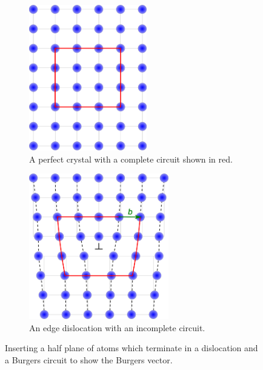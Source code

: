 \begin{figure}
\centering

\begin{subfigure}{0.4\textwidth}
\centering
\includegraphics[height=2.5in]{Perfect_crystal_loop}
\caption{A perfect crystal with a complete circuit shown in red.}
\end{subfigure}
\begin{subfigure}{0.4\textwidth}
\centering
\includegraphics[height=2.5in]{Edge_Dislocation_loop}
\caption{An edge dislocation with an incomplete circuit. \label{fig:Edge_disloc_loop}}
\end{subfigure}

\caption{Inserting a half plane of atoms which terminate in a dislocation and a Burgers circuit to show the Burgers vector. \label{fig:burgers_loops}}

\end{figure}

